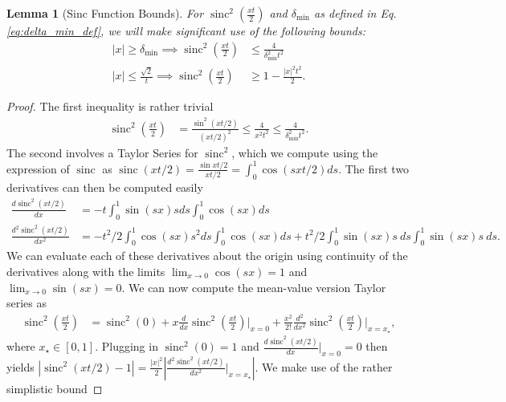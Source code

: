 \documentclass[
 amsmath,amssymb,
 aps,
onecolumn, 
nofootinbib]{revtex4-2}
\newtheorem{lemma}[theorem]{Lemma}
\newcommand{\abs}[1]{\left| #1 \right|}
\DeclareMathOperator{\sinc}{sinc}
\begin{document}
\begin{lemma}[Sinc Function Bounds] \label{lem:sinc_poly_approx}
    For $\sinc^2\left( \frac{x t}{2} \right)$ and $\delta_{\min}$ as defined in Eq. \eqref{eq:delta_min_def}, we will make significant use of the following bounds:
    \begin{align}
        |x| \ge \delta_{\min} \implies \sinc^2 \left( \frac{x t}{2} \right) &\le \frac{4}{\delta_{\min}^2 t^2} \label{eq:sinc_upper_bound} \\
        |x| \le \frac{\sqrt{2}}{t} \implies \sinc^2\left(\frac{x t}{2} \right) &\ge 1 - \frac{|x|^2 t^2}{2}. \label{eq:sinc_lower_bound}
\end{align}

\end{lemma}
\begin{proof}
    The first inequality is rather trivial
    \begin{align}
        \sinc^2 \left( \frac{x t}{2} \right) &= \frac{\sin^2 (x t /2)}{(x t / 2)^2} \le \frac{4}{x^2 t^2} \le \frac{4}{\delta_{\min}^2 t^2}.
    \end{align}
    The second involves a Taylor Series for $\sinc^2$, which we compute using the expression of $\sinc$ as $\sinc(x t/ 2) = \frac{\sin xt /2}{xt/2} = \int_0^1 \cos(sxt/2) ds$.  The first two derivatives can then be computed easily
    \begin{align}
        \frac{d \sinc^2(x t /2)}{dx} &= - t \int_0^1 \sin(sx) s ds \int_0^1 \cos(sx) ds \\
        \frac{d^2 \sinc^2(x t /2)}{dx^2} &= -t^2 / 2 \int_0^1 \cos(sx)s^2 ds \int_0^1 \cos(sx) ds + t^2 / 2 \int_0^1 \sin(sx) s ~ds \int_0^1 \sin(sx) s ~ds.
    \end{align}
    We can evaluate each of these derivatives about the origin using continuity of the derivatives along with the limits $\lim_{x \to 0} \cos(sx) = 1$ and $\lim_{x \to 0} \sin(sx) = 0$. We can now compute the mean-value version Taylor series as
    \begin{align}
        \sinc^2 \left(\frac{x t}{2} \right) &= \sinc^2(0) + x \frac{d}{dx} \sinc^2 \left(\frac{x t}{2} \right) \bigg|_{x = 0} + \frac{x^2}{2!} \frac{d^2}{dx^2} \sinc^2 \left(\frac{x t}{2} \right) \bigg|_{x = x_{\star}},
    \end{align}
    where $x_{\star} \in [0,1]$. 
    Plugging in $\sinc^2(0) = 1$ and $\frac{d\sinc^2(x t /2)}{dx}\big|_{x = 0} = 0$ then yields $|\sinc^2(xt/2) - 1| = \frac{|x|^2}{2} \abs{\frac{d^2\sinc^2(x t / 2)}{dx^2}\big|_{x = x_{\star}}}$. We make use of the rather simplistic bound

\end{proof}
\end{document}
